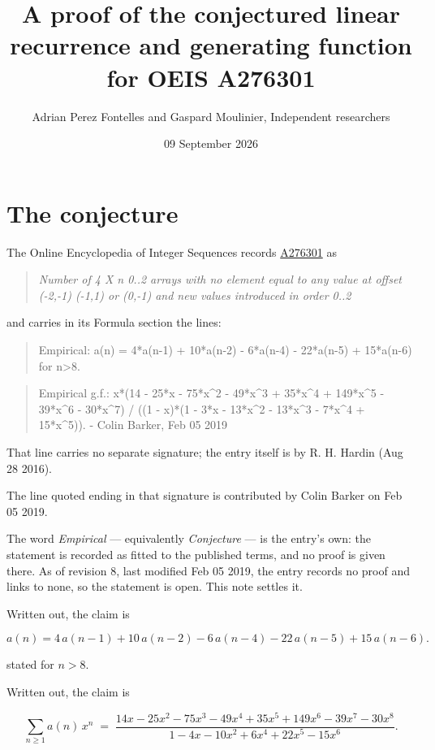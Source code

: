 \documentclass[11pt]{article}
\title{A proof of the conjectured linear recurrence and generating function for OEIS A276301}
\author{Adrian Perez Fontelles and Gaspard Moulinier, Independent researchers}
\date{09 September 2026}
\theoremstyle{definition}
\begin{document}
\maketitle
\section{The conjecture}

The Online Encyclopedia of Integer Sequences records \href{https://oeis.org/A276301}{A276301} as

\begin{quote}\itshape Number of 4 X n 0..2 arrays with no element equal to any value at offset (-2,-1) (-1,1) or (0,-1) and new values introduced in order 0..2\end{quote}

and carries in its Formula section the lines:

\begin{quote}\ttfamily Empirical: a(n) = 4*a(n-1) + 10*a(n-2) - 6*a(n-4) - 22*a(n-5) + 15*a(n-6) for n>8.\end{quote}

\begin{quote}\ttfamily Empirical g.f.: x*(14 - 25*x - 75*x\textasciicircum{}2 - 49*x\textasciicircum{}3 + 35*x\textasciicircum{}4 + 149*x\textasciicircum{}5 - 39*x\textasciicircum{}6 - 30*x\textasciicircum{}7) / ((1 - x)*(1 - 3*x - 13*x\textasciicircum{}2 - 13*x\textasciicircum{}3 - 7*x\textasciicircum{}4 + 15*x\textasciicircum{}5)). - Colin Barker, Feb 05 2019\end{quote}

That line carries no separate signature; the entry itself is by R. H. Hardin (Aug 28 2016).

The line quoted ending in that signature is contributed by Colin Barker on Feb 05 2019.

The word {\itshape Empirical} --- equivalently {\itshape Conjecture} --- is the entry's own: the statement is recorded as fitted to the published terms, and no proof is given there. As of revision 8, last modified Feb 05 2019, the entry records no proof and links to none, so the statement is open. This note settles it.

Written out, the claim is

\[a(n) = 4\,a(n-1) + 10\,a(n-2) - 6\,a(n-4) - 22\,a(n-5) + 15\,a(n-6).\]

stated for $n > 8$.

Written out, the claim is

\[\sum_{n \ge 1} a(n)\,x^n \;=\; \frac{14x - 25x^{2} - 75x^{3} - 49x^{4} + 35x^{5} + 149x^{6} - 39x^{7} - 30x^{8}}{1 - 4x - 10x^{2} + 6x^{4} + 22x^{5} - 15x^{6}}.\]
\end{document}
